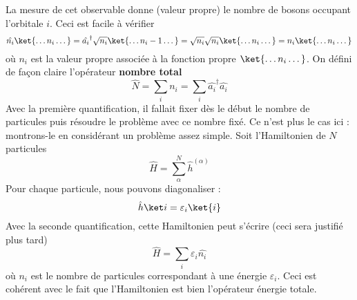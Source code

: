 La mesure de cet observable donne (valeur propre) le nombre de bosons occupant l'orbitale $i$. Ceci est facile à 
vérifier
\begin{equation}
\hat{n_i}\ket{\dots n_i\dots} = \hat{a_i}^\dagger\sqrt{n_i}\ket{\dots n_i-1\dots}=
\sqrt{n_i}\sqrt{n_i}\ket{\dots n_i\dots} = n_i\ket{\dots n_i\dots}
\end{equation}
où $n_i$ est la valeur propre associée à la fonction propre $\ket{\dots n_i\dots}$. On défini de façon claire 
l'opérateur \textbf{nombre total}
\begin{equation}
\hat{N} = \sum_i n_i = \sum_i \hat{a_i}^\dagger\hat{a_i}
\end{equation}
Avec la première quantification, il fallait fixer dès le début le nombre de particules puis résoudre le 
problème avec ce nombre fixé. Ce n'est plus le cas ici : montrons-le en considérant un problème assez 
simple. Soit l'Hamiltonien de $N$ particules
\begin{equation}
\hat{H} = \sum_\alpha^N \hat{h}^{(\alpha)} 
\end{equation}
Pour chaque particule, nous pouvons diagonaliser :
\begin{equation}
\hat{h}\ket i = \varepsilon_i\ket{i}
\end{equation}
Avec la seconde quantification, cette Hamiltonien peut s'écrire (ceci sera justifié plus tard)
\begin{equation}
\hat{H} = \sum_i \varepsilon_i \hat{n_i}
\end{equation}
où $n_i$ est le nombre de particules correspondant à une énergie $\varepsilon_i$. Ceci est cohérent 
avec le fait que l'Hamiltonien est bien l'opérateur énergie totale.


